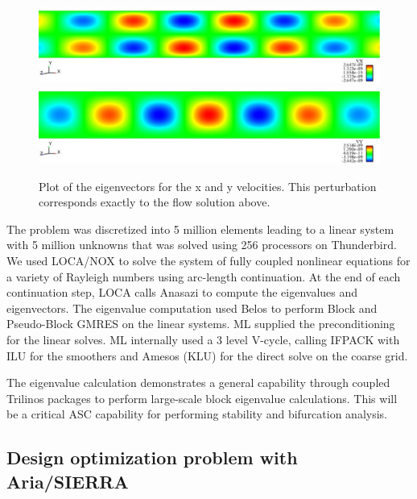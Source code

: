 \documentclass[pdf,ps2pdf,11pt]{SANDreport}
\begin{document}
{{\bsinglespace
\begin{figure}
\begin{center}
\includegraphics*[angle=0,scale=0.30]{figures/ms_eigenvalue_vx.eps}
\includegraphics*[angle=0,scale=0.30]{figures/ms_eigenvalue_vy.eps}
\end{center}
\caption[Eigenvalues for the hydromagnetic Rayleigh-Bernard problem]{
\label{fig:hrbEigenvalues}
Plot of the eigenvectors for the x and y velocities.  This perturbation
corresponds exactly to the flow solution above.}
\end{figure}
\esinglespace}

The problem was discretized into 5 million elements leading to a
linear system with 5 million unknowns that was solved using 256
processors on Thunderbird.  We used LOCA/NOX to solve the system of
fully coupled nonlinear equations for a variety of Rayleigh numbers
using arc-length continuation.  At the end of each continuation step,
LOCA calls Anasazi to compute the eigenvalues and eigenvectors.  The
eigenvalue computation used Belos to perform Block and Pseudo-Block
GMRES on the linear systems.  ML supplied the preconditioning for the
linear solves.  ML internally used a 3 level V-cycle, calling IFPACK
with ILU for the smoothers and Amesos (KLU) for the direct solve on
the coarse grid.

The eigenvalue calculation demonstrates a general capability through coupled
Trilinos packages to perform large-scale block eigenvalue calculations.  This
will be a critical ASC capability for performing stability and bifurcation
analysis.

%
\subsection{Design optimization problem with Aria/SIERRA}
%

}
\end{document}
